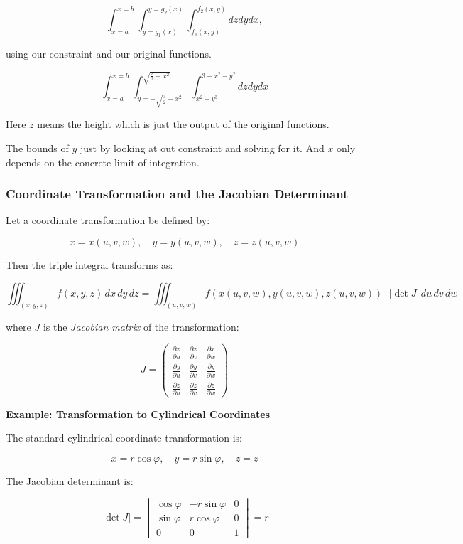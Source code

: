 \[
    \int_{x=a}^{x=b}\int_{y=g_1(x)}^{y=g_2(x)} \int_{f_1(x,y)}^{f_2(x,y)} dz dy dx,
\]

using our constraint and our original functions.

\[
    \int_{x=a}^{x=b}\int_{y=-\sqrt{\frac{3}{2} - x^2}}^{\sqrt{\frac{3}{2} -x^2}} 
    \int_{x^2 + y^3}^{3-x^2-y^2} dz dy dx
\]

Here \(z\) means the height which is just the output
of the original functions.

The bounds of \(y\) just by looking at out constraint and solving for it.
And \(x\) only depends on the concrete limit of integration.

\subsubsection{Coordinate Transformation and the Jacobian Determinant}

Let a coordinate transformation be defined by:

\[
    x = x(u, v, w), \quad y = y(u, v, w), \quad z = z(u, v, w)
\]

Then the triple integral transforms as:

\[
    \iiint_{(x, y, z)} f(x, y, z)\, dx\, dy\, dz = \iiint_{(u, v, w)} f(x(u, v, w), y(u, v, w), 
    z(u, v, w)) \cdot \left| \det J \right|\, du\, dv\, dw
\]

where \( J \) is the \emph{Jacobian matrix} of the transformation:

\[
    J = 
    \begin{pmatrix}
    \frac{\partial x}{\partial u} & \frac{\partial x}{\partial v} & \frac{\partial x}{\partial w} \\
    \frac{\partial y}{\partial u} & \frac{\partial y}{\partial v} & \frac{\partial y}{\partial w} \\
    \frac{\partial z}{\partial u} & \frac{\partial z}{\partial v} & \frac{\partial z}{\partial w}
    \end{pmatrix}
\]

\textbf{Example: Transformation to Cylindrical Coordinates}

The standard cylindrical coordinate transformation is:

\[
    x = r \cos \varphi, \quad y = r \sin \varphi, \quad z = z
\]

The Jacobian determinant is:

\[
    \left| \det J \right| =
    \begin{vmatrix}
    \cos \varphi & -r \sin \varphi & 0 \\
    \sin \varphi & r \cos \varphi & 0 \\
    0 & 0 & 1
    \end{vmatrix}
    = r
\]

